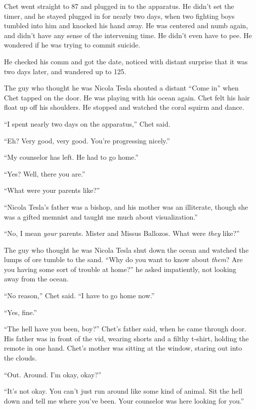 \tb

Chet went straight to 87 and plugged in to the apparatus. He didn't
set the timer, and he stayed plugged in for nearly two days, when
two fighting boys tumbled into him and knocked his hand away. He
was centered and numb again, and didn't have any sense of the
intervening time. He didn't even have to pee. He wondered if he was
trying to commit suicide.

He checked his comm and got the date, noticed with distant surprise
that it was two days later, and wandered up to 125.

The guy who thought he was Nicola Tesla shouted a distant
``Come in'' when Chet tapped on the door. He was playing with his
ocean again. Chet felt his hair float up off his shoulders. He
stopped and watched the coral squirm and dance.

``I spent nearly two days on the apparatus,'' Chet said.

``Eh? Very good, very good. You're progressing nicely.''

``My counselor has left. He had to go home.''

``Yes? Well, there you are.''

``What were your parents like?''

``Nicola Tesla's father was a bishop, and his mother was an illiterate, though 
she was a gifted memnist and taught me much about visualization.''

``No, I mean \emph{your} parents. Mister and Missus Ballozos. What were 
\emph{they} like?''

The guy who thought he was Nicola Tesla shut down the ocean and
watched the lumps of ore tumble to the sand.
``Why do you want to know about \emph{them}? Are you having some sort of 
trouble at home?''
he asked impatiently, not looking away from the ocean.

``No reason,'' Chet said. ``I have to go home now.''

``Yes, fine.''

\tb

``The hell have you been, boy?'' Chet's father said, when he came
through door. His father was in front of the vid, wearing shorts
and a filthy t-shirt, holding the remote in one hand. Chet's mother
was sitting at the window, staring out into the clouds.

``Out. Around. I'm okay, okay?''

``It's not okay. You can't just run around like some kind of animal. Sit the 
hell down and tell me where you've been. Your counselor was here looking for 
you.''

